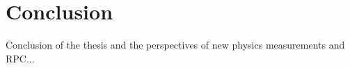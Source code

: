 \chapter{Conclusion}

Conclusion of the thesis and the perspectives of new physics measurements and RPC...

